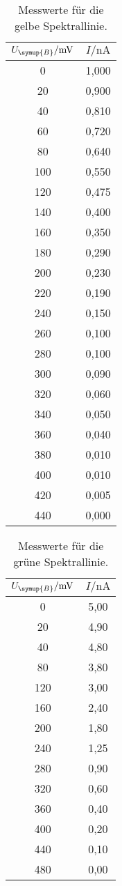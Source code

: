 \begin{table}[H]
    \centering
    \caption{Messwerte für die gelbe Spektrallinie.}
    \label{tab:gelb}
    \begin{tabular}{c c}
        \toprule
        $U_{\symup{B}} / \unit{\milli\volt}$ & $I / \unit{\nano\ampere}$ \\
        \midrule
         0 & 1,000 \\
        20 & 0,900 \\
        40 & 0,810 \\
        60 & 0,720 \\
        80 & 0,640 \\
       100 & 0,550 \\
       120 & 0,475 \\
       140 & 0,400 \\
       160 & 0,350 \\
       180 & 0,290 \\
       200 & 0,230 \\
       220 & 0,190 \\
       240 & 0,150 \\
       260 & 0,100 \\
       280 & 0,100 \\
       300 & 0,090 \\
       320 & 0,060 \\
       340 & 0,050 \\
       360 & 0,040 \\
       380 & 0,010 \\
       400 & 0,010 \\
       420 & 0,005 \\
       440 & 0,000 \\
        \bottomrule
    \end{tabular}
\end{table}

\begin{table}[H]
    \centering
    \caption{Messwerte für die grüne Spektrallinie.}
    \label{tab:gruen}
    \begin{tabular}{c c}
        \toprule
        $U_{\symup{B}} / \unit{\milli\volt}$ & $I / \unit{\nano\ampere}$ \\
        \midrule
          0 & 5,00 \\
         20 & 4,90 \\
         40 & 4,80 \\
         80 & 3,80 \\
        120 & 3,00 \\
        160 & 2,40 \\
        200 & 1,80 \\
        240 & 1,25 \\
        280 & 0,90 \\
        320 & 0,60 \\
        360 & 0,40 \\
        400 & 0,20 \\
        440 & 0,10 \\
        480 & 0,00 \\
        \bottomrule
    \end{tabular}
\end{table}

